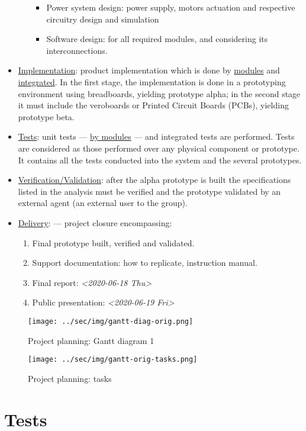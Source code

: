 \documentclass[11pt]{article}
\begin{document}
\begin{itemize}
\begin{itemize}
\begin{itemize}
\item Power system design: power supply, motors actuation and respective
circuitry design and simulation
\item Software design: for all required modules, and considering its
interconnections.
\end{itemize}
\end{itemize}
\item \uline{Implementation}: product implementation which is done by \uline{modules} and
\uline{integrated}. In the first stage, the implementation is done in a prototyping
environment using breadboards, yielding prototype alpha; in the second stage
it must include the veroboards or Printed Circuit Boards (PCBs), yielding
prototype beta.
\item \uline{Tests}: unit tests --- \uline{by modules} --- and integrated tests are
performed. Tests are considered as those performed over any physical
component or prototype. It contains all the tests conducted into the system
and the several prototypes.
\item \uline{Verification/Validation}: after the alpha prototype is built the
specifications listed in the analysis must be verified and the prototype
validated by an external agent (an external user to the group).
\item \uline{Delivery}: --- project closure encompassing:
\begin{enumerate}
\item Final prototype built, verified and validated.
\item Support documentation: how to replicate, instruction manual.
\item Final report: \textit{<2020-06-18 Thu>}
\item Public presentation: \textit{<2020-06-19 Fri> }
\end{enumerate}
\end{itemize}

\begin{figure}[htbp]
\centering
\texttt{[image: ../sec/img/gantt-diag-orig.png]}
\caption{\label{fig:gantt-diag2}Project planning: Gantt diagram 1}
\end{figure}
\begin{figure}[htbp]
\centering
\texttt{[image: ../sec/img/gantt-orig-tasks.png]}
\caption{\label{fig:gantt-tasks}Project planning: tasks}
\end{figure}

\section{Tests}
\label{sec:org3e2776f}
\end{document}
